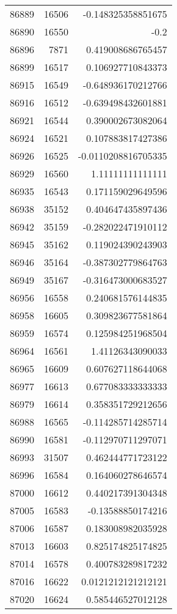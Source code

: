 \begin{tabular}{r | r | r}
86889 & 16506 & -0.148325358851675 \\
86890 & 16550 & -0.2 \\
86896 & 7871 & 0.419008686765457 \\
86899 & 16517 & 0.106927710843373 \\
86915 & 16549 & -0.648936170212766 \\
86916 & 16512 & -0.639498432601881 \\
86921 & 16544 & 0.390002673082064 \\
86924 & 16521 & 0.107883817427386 \\
86926 & 16525 & -0.0110208816705335 \\
86929 & 16560 & 1.11111111111111 \\
86935 & 16543 & 0.171159029649596 \\
86938 & 35152 & 0.404647435897436 \\
86942 & 35159 & -0.282022471910112 \\
86945 & 35162 & 0.119024390243903 \\
86946 & 35164 & -0.387302779864763 \\
86949 & 35167 & -0.316473000683527 \\
86956 & 16558 & 0.240681576144835 \\
86958 & 16605 & 0.309823677581864 \\
86959 & 16574 & 0.125984251968504 \\
86964 & 16561 & 1.41126343090033 \\
86965 & 16609 & 0.607627118644068 \\
86977 & 16613 & 0.677083333333333 \\
86979 & 16614 & 0.358351729212656 \\
86988 & 16565 & -0.114285714285714 \\
86990 & 16581 & -0.112970711297071 \\
86993 & 31507 & 0.462444771723122 \\
86996 & 16584 & 0.164060278646574 \\
87000 & 16612 & 0.440217391304348 \\
87005 & 16583 & -0.13588850174216 \\
87006 & 16587 & 0.183008982035928 \\
87013 & 16603 & 0.825174825174825 \\
87014 & 16578 & 0.400783289817232 \\
87016 & 16622 & 0.0121212121212121 \\
87020 & 16624 & 0.585446527012128 \\

\end{tabular}
